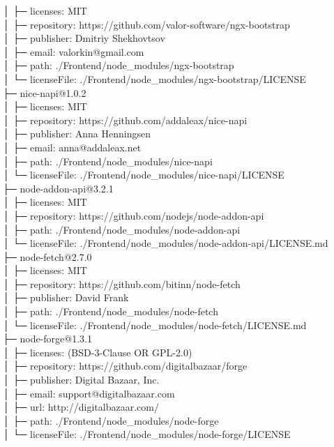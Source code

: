│  ├─ licenses: MIT\\
│  ├─ repository: https://github.com/valor-software/ngx-bootstrap\\
│  ├─ publisher: Dmitriy Shekhovtsov\\
│  ├─ email: valorkin@gmail.com\\
│  ├─ path: ./Frontend/node\_modules/ngx-bootstrap\\
│  └─ licenseFile: ./Frontend/node\_modules/ngx-bootstrap/LICENSE\\
├─ nice-napi@1.0.2\\
│  ├─ licenses: MIT\\
│  ├─ repository: https://github.com/addaleax/nice-napi\\
│  ├─ publisher: Anna Henningsen\\
│  ├─ email: anna@addaleax.net\\
│  ├─ path: ./Frontend/node\_modules/nice-napi\\
│  └─ licenseFile: ./Frontend/node\_modules/nice-napi/LICENSE\\
├─ node-addon-api@3.2.1\\
│  ├─ licenses: MIT\\
│  ├─ repository: https://github.com/nodejs/node-addon-api\\
│  ├─ path: ./Frontend/node\_modules/node-addon-api\\
│  └─ licenseFile: ./Frontend/node\_modules/node-addon-api/LICENSE.md\\
├─ node-fetch@2.7.0\\
│  ├─ licenses: MIT\\
│  ├─ repository: https://github.com/bitinn/node-fetch\\
│  ├─ publisher: David Frank\\
│  ├─ path: ./Frontend/node\_modules/node-fetch\\
│  └─ licenseFile: ./Frontend/node\_modules/node-fetch/LICENSE.md\\
├─ node-forge@1.3.1\\
│  ├─ licenses: (BSD-3-Clause OR GPL-2.0)\\
│  ├─ repository: https://github.com/digitalbazaar/forge\\
│  ├─ publisher: Digital Bazaar, Inc.\\
│  ├─ email: support@digitalbazaar.com\\
│  ├─ url: http://digitalbazaar.com/\\
│  ├─ path: ./Frontend/node\_modules/node-forge\\
│  └─ licenseFile: ./Frontend/node\_modules/node-forge/LICENSE\\
